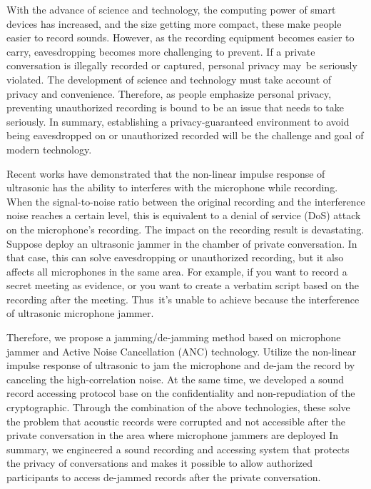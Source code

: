 \begin{abstract*}

    With the advance of science and technology,
the computing power of smart devices has increased,
and the size getting more compact,
these make people easier to record sounds.
However, as the recording equipment becomes easier to carry,
eavesdropping becomes more challenging to prevent.
If a private conversation is illegally recorded or captured,
personal privacy may be seriously violated.
The development of science and technology must take account of privacy and convenience.
Therefore, as people emphasize personal privacy,
preventing unauthorized recording is bound to be an issue that needs to take seriously.
In summary, establishing a privacy-guaranteed environment
to avoid being eavesdropped on or unauthorized recorded
will be the challenge and goal of modern technology.

    Recent works have demonstrated that the non-linear impulse response of ultrasonic
has the ability to interferes with the microphone while recording.
When the signal-to-noise ratio between the original recording
and the interference noise reaches a certain level,
this is equivalent to a denial of service (DoS) attack on the microphone's recording. The impact on the recording result is devastating.
Suppose deploy an ultrasonic jammer in the chamber of private conversation. In that case,
this can solve eavesdropping or unauthorized recording,
but it also affects all microphones in the same area. For example,
if you want to record a secret meeting as evidence,
or you want to create a verbatim script based on the recording after the meeting.
Thus it's unable to achieve because the interference of ultrasonic microphone jammer.

    Therefore, we propose a jamming/de-jamming method
based on microphone jammer and Active Noise Cancellation (ANC) technology.
Utilize the non-linear impulse response of ultrasonic to jam the microphone
and de-jam the record by canceling the high-correlation noise.
At the same time, we developed a sound record accessing protocol
base on the confidentiality and non-repudiation of the cryptographic.
Through the combination of the above technologies,
these solve the problem that acoustic records were corrupted and not accessible
after the private conversation in the area where microphone jammers are deployed
In summary, we engineered a sound recording and accessing system
that protects the privacy of conversations and makes it possible to allow authorized participants
to access de-jammed records after the private conversation.

\end{abstract*}